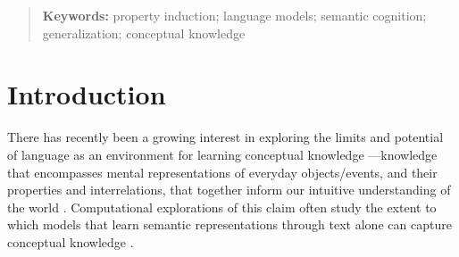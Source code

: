 \documentclass[10pt,letterpaper]{article}
\newcommand{\ake}[1]{\textcolor{blue}{$_{AE}$[#1]}}
\begin{document}
\begin{abstract}
\textbf{Keywords:} 
property induction; language models; semantic cognition; generalization; conceptual knowledge
\end{abstract}


\section{Introduction}
There has recently been a growing interest in exploring the limits and potential of language as an environment for learning conceptual knowledge \citep{elman2004alternative, lupyan2019words}---knowledge that encompasses mental representations of everyday objects/events, and their properties and interrelations, that together inform our intuitive understanding of the world \citep{murphy2004big, machery2009doing}.
Computational explorations of this claim often study the extent to which models that learn semantic representations through text alone can capture conceptual knowledge \citep{lucy-gauthier-2017-distributional, forbes2019neural, bhatia2020transformer}.
\end{document}
